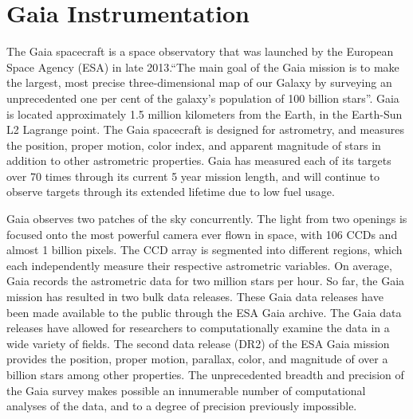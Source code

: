 \documentclass[aps,prb,twocolumn,groupedaddress,nofootinbib,floatfix]{revtex4-1}
\begin{document}
\section*{Gaia Instrumentation}
The Gaia spacecraft is a space observatory that was launched by the European Space Agency (ESA) in late 2013.``The main goal of the Gaia mission is to make the largest, most precise three-dimensional map of our Galaxy by surveying an unprecedented one per cent of the galaxy's population of 100 billion stars''\protect\cite{ESA}. Gaia is located approximately 1.5 million kilometers from the Earth, in the Earth-Sun L2 Lagrange point\protect\cite{ESA}. The Gaia spacecraft is designed for astrometry, and measures the position, proper motion, color index, and apparent magnitude of stars in addition to other astrometric properties. Gaia has measured each of its targets over 70 times through its current 5 year mission length, and will continue to observe targets through its extended lifetime due to low fuel usage\protect\cite{ESA}. 

Gaia observes two patches of the sky concurrently. The light from two openings is focused onto the most powerful camera ever flown in space, with 106 CCDs and almost 1 billion pixels\protect\cite{GaiaSpec}. The CCD array is segmented into different regions, which each independently measure their respective astrometric variables. On average, Gaia records the astrometric data for two million stars per hour\protect\cite{GaiaSpec}. So far, the Gaia mission has resulted in two bulk data releases. These Gaia data releases have been made available to the public through the ESA Gaia archive\protect\cite{GaiaData}. The Gaia data releases have allowed for researchers to computationally examine the data in a wide variety of fields. The second data release (DR2) of the ESA Gaia mission provides the position, proper motion, parallax, color, and magnitude of over a billion stars among other properties. The unprecedented breadth and precision of the Gaia survey makes possible an innumerable number of computational analyses of the data, and to a degree of precision previously impossible.
\end{document}

